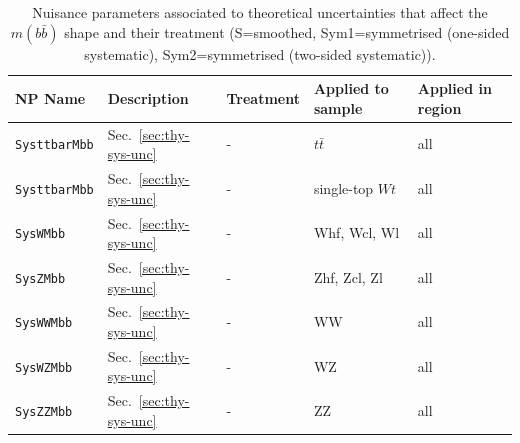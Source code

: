 \begin{table}[H]
    \centering
    \scriptsize
    \begin{tabular}{|p{3.5cm}|p{2.5cm}|p{1.5cm}|p{2cm}|p{1.5cm}|}
        \hline
        NP Name & Description & Treatment & Applied to sample & Applied in region \\
        \hline
        \texttt{SysttbarMbb} & Sec.~\ref{sec:thy-sys-unc} & - & $t\bar{t}$ & all \\
        \texttt{SysttbarMbb} & Sec.~\ref{sec:thy-sys-unc} & - & single-top $Wt$ & all \\
        \texttt{SysWMbb} & Sec.~\ref{sec:thy-sys-unc} & - & Whf, Wcl, Wl & all \\
        \texttt{SysZMbb} & Sec.~\ref{sec:thy-sys-unc} & - & Zhf, Zcl, Zl & all \\
        \texttt{SysWWMbb} & Sec.~\ref{sec:thy-sys-unc} & - & WW & all \\
        \texttt{SysWZMbb} & Sec.~\ref{sec:thy-sys-unc} & - & WZ & all \\
        \texttt{SysZZMbb} & Sec.~\ref{sec:thy-sys-unc} & - & ZZ & all \\
        \hline
    \end{tabular}
    \caption{Nuisance parameters associated to theoretical uncertainties that affect the $m(b\bar{b})$ shape and their treatment (S=smoothed, Sym1=symmetrised (one-sided systematic), Sym2=symmetrised (two-sided systematic)).}
    \label{tab:np-shape1}
\end{table}

